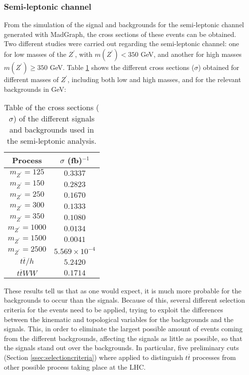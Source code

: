 \subsubsection{Semi-leptonic channel} \label{ssec:semi-leptonic channel}

From the simulation of the signal and backgrounds for the semi-leptonic channel generated with MadGraph, the cross sections of these events can be obtained. Two different studies were carried out regarding the semi-leptonic channel: one for low masses of the $Z^{\prime}$, with $m(Z^{\prime}) < 350$ GeV, and another for high masses $m(Z^{\prime}) \geq 350$ GeV. Table \ref{crosssections} shows the different cross sections ($\sigma$) obtained for different masses of $Z^{\prime}$, including both low and high masses, and for the relevant backgrounds in GeV:

\begin{table}[ht!]
\centering
\caption{Table of the cross sections ($\sigma$) of the different signals and backgrounds used in the semi-leptonic analysis.}
\label{crosssections}
\begin{tabular}{cc}
\hline
\hline
Process & $\sigma$ (fb)$^{-1}$ \\
\hline
$m_{Z^{\prime}} = 125$ & $0.3337$ \\
$m_{Z^{\prime}} = 150$ & $0.2823$ \\
$m_{Z^{\prime}} = 250$ & $0.1670$ \\
$m_{Z^{\prime}} = 300$ & $0.1333$ \\
$m_{Z^{\prime}} = 350$ & $0.1080$ \\
$m_{Z^{\prime}} = 1000$ & $0.0134$ \\
$m_{Z^{\prime}} = 1500$ & $0.0041$ \\
$m_{Z^{\prime}} = 2500$ & $5.569\times10^{-4}$ \\
$t\overline t/h$ & $5.2420$ \\
$t\overline tWW$ & $0.1714$ \\
\hline
\hline
\end{tabular}
\end{table}

These results tell us that as one would expect, it is much more probable for the backgrounds to occur than the signals. Because of this, several different selection criteria for the events need to be applied, trying to exploit the differences between the kinematic and topological variables for the backgrounds and the signals. This, in order to eliminate the largest possible amount of events coming from the different backgrounds, affecting the signals as little as possible, so that the signals stand out over the backgrounds. In particular, five preliminary cuts (Section \ref{ssec:selectioncriteria}) where applied to distinguish $t\overline t$ processes from other possible process taking place at the LHC. 


